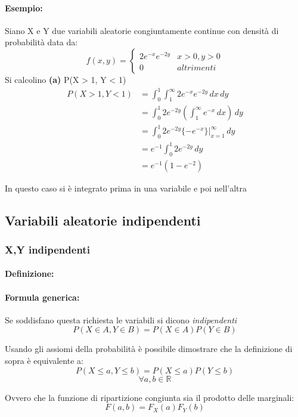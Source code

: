 \documentclass[]{article}
\newcommand{\definizione}{\paragraph{Definizione:}}
\newcommand{\formula}{\paragraph{Formula generica:}}
\begin{document}
    \paragraph{Esempio:} Siano X e Y due variabili aleatorie congiuntamente continue con densità
    di probabilità data da:
    \begin{equation*}
        f(x,y) =
        \begin{cases}
            2e^{-x} e^{-2y} & x > 0, y > 0 \\
            0 & altrimenti
        \end{cases}
    \end{equation*}
    Si calcolino \textbf{(a)} P(X > 1, Y < 1)
    \begin{equation*}
        \begin{split}
            P(X > 1, Y < 1) & = \int_{0}^{1} \int_{1}^{\infty} 2e^{-x} e^{-2y} \, dx \, dy \\
            & = \int_{0}^{1} 2e^{-2y} (\int_{1}^{\infty} e^{-x} \, dx) \, dy \\
            & = \int_{0}^{1} 2e^{-2y}\{ -e^{-x}\} \rvert_{x=1}^{\infty} \, dy \\
            & = e^{-1} \int_{0}^{1} 2e^{-2y} \, dy \\
            & = e^{-1}(1 - e^{-2})
        \end{split}
    \end{equation*}
    \centerline{In questo caso si è integrato prima in una variabile e poi nell'altra}

    \subsection{Variabili aleatorie indipendenti}
    \subsubsection{X,Y indipendenti}
    \definizione
    \formula Se soddisfano questa richiesta le variabili si dicono \textit{indipendenti} 
    \[ P(X \in A, Y \in B) = P(X \in A) P(Y \in B)\]

    Usando gli assiomi della probabilità è possibile dimostrare che la definizione di sopra è equivalente a:
    \[ P(X \leq a, Y \leq b) = P(X \leq a) P(Y \leq b)\]
    \[ \forall a,b \in \mathbb{R} \]
    \linebreak[3]

    Ovvero che la funzione di ripartizione congiunta sia il prodotto delle marginali:
    \[ F(a,b) = F_X(a) F_Y(b)\]
\end{document}
